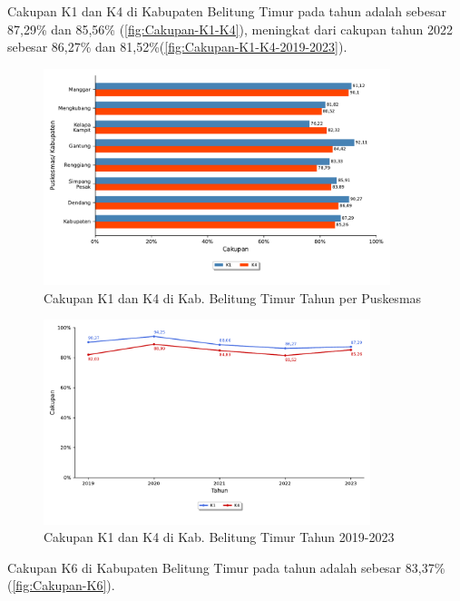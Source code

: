 Cakupan K1 dan K4 di Kabupaten Belitung Timur pada tahun \tP adalah sebesar 87,29\% dan 85,56\% (\autoref{fig:Cakupan-K1-K4}), meningkat dari cakupan tahun 2022 sebesar 86,27\% dan 81,52\%(\autoref{fig:Cakupan-K1-K4-2019-2023}).

\begin{figure}[H]
    \centering{}
    \includegraphics[width=0.9\textwidth]{bab_05/bab_05_03_K1K4}
    \caption{Cakupan K1 dan K4 di Kab. Belitung Timur Tahun \tP per Puskesmas}
    \label{fig:Cakupan-K1-K4}
\end{figure}

\begin{figure}[H]
    \centering{}
    \includegraphics[width=0.85\textwidth]{bab_05/bab_05_03a_plotK1K4}
    \caption{Cakupan K1 dan K4 di Kab. Belitung Timur Tahun 2019-2023}
    \label{fig:Cakupan-K1-K4-2019-2023}
\end{figure}

Cakupan K6 di Kabupaten Belitung Timur pada tahun \tP adalah sebesar 83,37\% (\autoref{fig:Cakupan-K6}).

